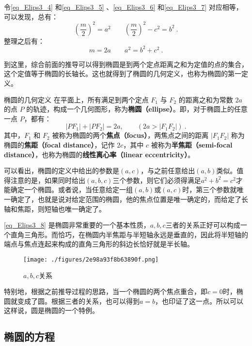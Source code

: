 令\autoref{eq_Elips3_4} 和\autoref{eq_Elips3_5} 、\autoref{eq_Elips3_6} 和\autoref{eq_Elips3_7} 对应相等，可以发现，总有：
\begin{equation}
\left(\frac{m}{2}\right)^2=a^2\qquad
\left(\frac{m}{2}\right)^2-c^2=b^2~.
\end{equation}
整理之后有：
\begin{equation}\label{eq_Elips3_8}
m=2a\qquad
a^2=b^2+c^2~.
\end{equation}

到这里，综合前面的推导可以得到椭圆是到两个定点距离之和为定值的点的集合，这个定值等于椭圆的长轴长。这也就得到了椭圆的几何定义，也称为椭圆的第一定义。

\begin{definition}{椭圆的几何定义}
在平面上，所有满足到两个定点 $F_1$ 与 $F_2$ 的距离之和为常数 $2a$ 的点 $P$ 的轨迹，构成一个几何图形，称为\textbf{椭圆（ellipse）}。即，对于椭圆上的任意一点 $P$，都有：
\begin{equation}\label{eq_Elips3_9}
|PF_1| + |PF_2| = 2a ,\qquad(2a>|F_1F_2|)~.
\end{equation}
其中，$F_1$ 和 $F_2$ 被称为椭圆的两个\textbf{焦点（focus）}，两焦点之间的距离 $|F_1F_2|$ 称为椭圆的\textbf{焦距（focal distance）}，记作 $2c$，其中 $c$ 被称为\textbf{半焦距（semi-focal distance）}，也称为椭圆的\textbf{线性离心率（linear eccentricity）}。
\end{definition}

可以看出，椭圆的定义中给出的参数是$(a,c)$，与之前任意给出$(a,b)$类似。值得注意的是，如果同时给出$(a,b,c)$三个参数，则它们必须得满足$a^2+b^2=c^2$才能确定一个椭圆。或者说，当任意给定一组$(a,b)$或$(a,c)$时，第三个参数就唯一确定了，也就是说对给定范围的椭圆，他的焦点位置是唯一确定的，而给定了长轴和焦距，则短轴也唯一确定了。

\autoref{eq_Elips3_8} 是椭圆非常重要的一个基本性质，$a,b,c$三者的关系正好可以构成一个直角三角形。而恰巧，在椭圆内半焦距与半短轴永远是垂直的，因此将半短轴的端点与焦点连起来构成的直角三角形的斜边长恰好就是半长轴。
\begin{figure}[ht]
\centering
\texttt{[image: ./figures/2e98a93f8b63890f.png]}
\caption{$a,b,c$关系} \label{fig_Elips3_3}
\end{figure}
特别地，根据之前推导过程的思路，当一个椭圆的两个焦点重合，即$c=0$时，椭圆就变成了圆。根据三者的关系，也可以得到$a=b$，也印证了这一点。所以可以这样说，圆是椭圆的一个特例。

\subsection{椭圆的方程}

